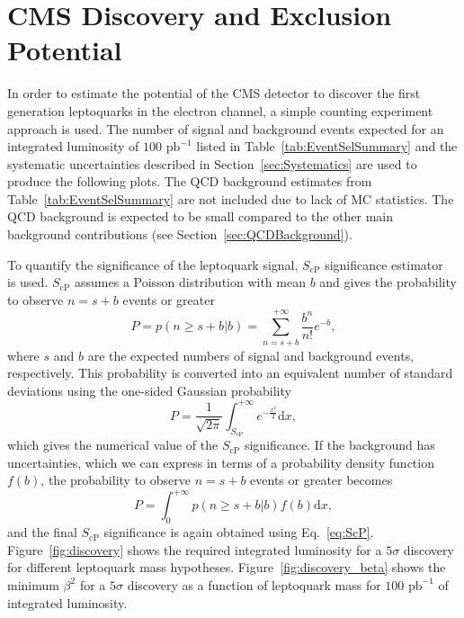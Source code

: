 %

\section{CMS Discovery and Exclusion Potential} \label{CMSpotential}

In order to estimate the potential of the CMS detector to discover the first generation leptoquarks
in the electron channel, a simple counting experiment approach is used. 
The number of signal and background events expected for an integrated luminosity of
$100\text{ pb}^{-1}$ listed in Table~\ref{tab:EventSelSummary} and the systematic uncertainties described 
in Section~\ref{sec:Systematics} are used to produce the following plots. 
The QCD background estimates from Table~\ref{tab:EventSelSummary} 
are not included due to lack of MC statistics. The QCD background is expected to be 
small compared to the other main background contributions (see Section~\ref{sec:QCDBackground}).

To quantify the significance of the
leptoquark signal, $S_\text{cP}$ significance estimator~\cite{ref:scp} is used. $S_\text{cP}$ assumes a Poisson distribution
with mean $b$ and gives the probability to observe $n=s+b$ events or greater
\begin{equation}
P = p(n\geq s+b|b) = \sum_{n=s+b}^{+\infty} \frac{b^n}{n!}e^{-b},
\end{equation}
where $s$ and $b$ are the expected numbers of signal and background events, respectively. This probability is 
converted into an equivalent number of standard deviations using the one-sided Gaussian probability
\begin{equation}
P = \frac{1}{\sqrt{2\pi}}\int_{S_\text{cP}}^{+\infty} e^{-\frac{x^2}{2}}\mathrm{d}x,
\label{eq:ScP}
\end{equation}
which gives the numerical value of the $S_\text{cP}$ significance. If the background has uncertainties, which we can express in terms of
a probability density function $f(b)$, the probability to observe $n=s+b$ events or greater becomes
\begin{equation}
P = \int_0^{+\infty} p(n\geq s+b|b)f(b)\mathrm{d}x,
\end{equation}
and the final $S_\text{cP}$ significance is again obtained using Eq.~\ref{eq:ScP}. Figure~\ref{fig:discovery} shows the required integrated luminosity
for a $5\sigma$ discovery for different leptoquark mass hypotheses. Figure~\ref{fig:discovery_beta} shows the minimum $\beta^2$ for
a $5\sigma$ discovery as a function of leptoquark mass for $100\text{ pb}^{-1}$ of integrated luminosity.

